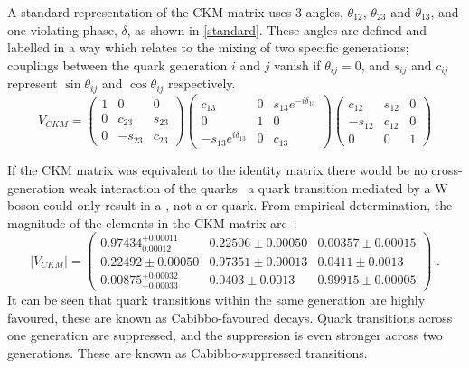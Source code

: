 A standard representation of the CKM matrix uses 3 angles, $\theta_{12}$, $\theta_{23}$ and $\theta_{13}$, and one \CP violating phase, $\delta$, as shown in \eqn\ref{standard}. These angles are defined and labelled in a way which relates to the mixing of two specific generations; couplings between the quark generation $i$ and $j$ vanish if $\theta_{ij} = 0$, and $s_{ij}$ and $c_{ij}$ represent $\sin\theta_{ij}$ and $\cos\theta_{ij}$ respectively.
\begin{equation}
V_{CKM} = \begin{pmatrix} 1 & 0 & 0 \\ 
0 & c_{23} & s_{23} \\ 
0 & -s_{23} & c_{23} \end{pmatrix}
\begin{pmatrix} c_{13} & 0 & s_{13}e^{-i\delta_{13}} \\ 
0 & 1 & 0 \\ 
-s_{13}e^{i\delta_{13}} & 0 & c_{13} \end{pmatrix}
\begin{pmatrix} c_{12} & s_{12} & 0 \\ 
-s_{12} & c_{12} & 0 \\ 
0 & 0 & 1 \end{pmatrix}
\label{standard}
\end{equation}

If the CKM matrix was equivalent to the identity matrix there would be no cross-generation weak interaction of the quarks \eg\ a \uquark quark transition mediated by a W boson could only result in a \dquark, not a \squark or \bquark quark. From empirical determination, the magnitude of the elements in the CKM matrix are~\cite{PDG2016}:
\begin{equation}
| V_{CKM} | = \begin{pmatrix} 0.97434^{+0.00011}_{0.00012} & 0.22506 \pm 0.00050 & 0.00357 \pm 0.00015 \\ 0.22492 \pm 0.00050 & 0.97351 \pm 0.00013 & 0.0411 \pm 0.0013 \\ 0.00875^{+0.00032}_{-0.00033} & 0.0403 \pm 0.0013 & 0.99915 \pm 0.00005 \end{pmatrix} \text{ .}
\end{equation}
It can be seen that quark transitions within the same generation are highly favoured, these are known as Cabibbo-favoured decays. Quark transitions across one generation are suppressed, and the suppression is even stronger across two generations. These are known as Cabibbo-suppressed transitions. 

